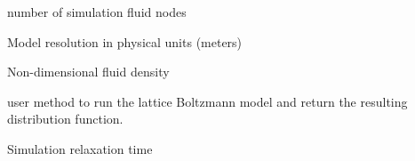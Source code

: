 \documentclass[letterpaper,10pt,english]{sphinxmanual}
\begin{document}
\begin{fulllineitems}
\begin{fulllineitems}
\end{fulllineitems}


\begin{fulllineitems}
\label{\detokenize{index:lb_colloids.LB.LB_2Dpermeability.LB2DModel.q}}
 \textendash{} number of simulation fluid nodes

\end{fulllineitems}


\begin{fulllineitems}
\label{\detokenize{index:lb_colloids.LB.LB_2Dpermeability.LB2DModel.resolution}}
 \textendash{} Model resolution in physical units (meters)

\end{fulllineitems}


\begin{fulllineitems}
\label{\detokenize{index:lb_colloids.LB.LB_2Dpermeability.LB2DModel.rho}}
 \textendash{} Non-dimensional fluid density

\end{fulllineitems}


\begin{fulllineitems}
\label{\detokenize{index:lb_colloids.LB.LB_2Dpermeability.LB2DModel.run}}
user method to run the lattice Boltzmann model and return the resulting
distribution function.

\end{fulllineitems}


\begin{fulllineitems}
\label{\detokenize{index:lb_colloids.LB.LB_2Dpermeability.LB2DModel.tau}}
 \textendash{} Simulation relaxation time


\end{fulllineitems}
\end{fulllineitems}
\end{document}
